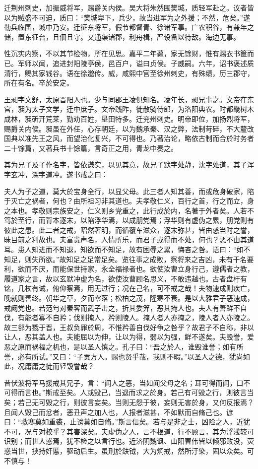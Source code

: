 \documentclass[12pt,UTF8]{ctexbook}
\begin{document}
迁荆州刺史，加振威将军，赐爵关内侯。吴大将朱然围樊城，质轻军赴之。议者皆以为贼盛不可迫，质曰：“樊城卑下，兵少，故当进军为之外援；不然，危矣。”遂勒兵临围，城中乃安。迁征东将军，假节都督青、徐诸军事。广农积谷，有兼年之储，置东征台，且佃且守。又通渠诸郡，利舟楫，严设备以待敌。海边无事。

性沉实内察，不以其节检物，所在见思。嘉平二年薨，家无馀财，惟有赐衣书箧而已。军师以闻，追进封阳陵亭侯，邑百户，谥曰贞侯。子威嗣。六年，诏书褒述质清行，赐其家钱谷。语在徐邈传。威，咸熙中官至徐州刺史，有殊绩，历三郡守，所在有名。卒於安定。

王昶字文舒，太原晋阳人也。少与同郡王凌俱知名。凌年长，昶兄事之。文帝在东宫，昶为太子文学，迁中庶子。文帝践阼，徙散骑侍郎，为洛阳典农。时都畿树木成林，昶斫开荒莱，勤劝百姓，垦田特多。迁兖州刺史。明帝即位，加扬烈将军，赐爵关内侯。昶虽在外任，心存朝廷，以为魏承秦、汉之弊，法制苛碎，不大釐改国典以准先王之风，而望治化复兴，不可得也。乃著治论，略依古制而合於时务者二十馀篇，又著兵书十馀篇，言奇正之用，青龙中奏之。

其为兄子及子作名字，皆依谦实，以见其意，故兄子默字处静，沈字处道，其子浑字玄冲，深字道冲。遂书戒之曰：

夫人为子之道，莫大於宝身全行，以显父母。此三者人知其善，而或危身破家，陷于灭亡之祸者，何也？由所祖习非其道也。夫孝敬仁义，百行之首，行之而立，身之本也。孝敬则宗族安之，仁义则乡党重之，此行成於内，名著于外者矣。人若不笃於至行，而背本逐末，以陷浮华焉，以成朋党焉；浮华则有虚伪之累，朋党则有彼此之患。此二者之戒，昭然著明，而循覆车滋众，逐末弥甚，皆由惑当时之誉，昧目前之利故也。夫富贵声名，人情所乐，而君子或得而不处，何也？恶不由其道耳。患人知进而不知退，知欲而不知足，故有困辱之累，悔吝之咎。语曰：“如不知足，则失所欲。”故知足之足常足矣。览往事之成败，察将来之吉凶，未有干名要利，欲而不厌，而能保世持家，永全福禄者也。欲使汝曹立身行己，遵儒者之教，履道家之言，故以玄默冲虚为名，欲使汝曹顾名思义，不敢违越也。古者盘杅有铭，几杖有诫，俯仰察焉，用无过行；况在己名，可不戒之哉！夫物速成则疾亡，晚就则善终。朝华之草，夕而零落；松柏之茂，隆寒不衰。是以大雅君子恶速成，戒阙党也。若范匄对秦客而武子击之，折其委笄，恶其掩人也。夫人有善鲜不自伐，有能者寡不自矜；伐则掩人，矜则陵人。掩人者人亦掩之，陵人者人亦陵之。故三郤为戮于晋，王叔负罪於周，不惟矜善自伐好争之咎乎？故君子不自称，非以让人，恶其盖人也。夫能屈以为伸，让以为得，弱以为强，鲜不遂矣。夫毁誉，爱恶之原而祸福之机也，是以圣人慎之。孔子曰：“吾之於人，谁毁谁誉；如有所誉，必有所试。”又曰：“子贡方人。赐也贤乎哉，我则不暇。”以圣人之德，犹尚如此，况庸庸之徒而轻毁誉哉？

昔伏波将军马援戒其兄子，言：“闻人之恶，当如闻父母之名；耳可得而闻，口不可得而言也。”斯戒至矣。人或毁己，当退而求之於身。若己有可毁之行，则彼言当矣；若己无可毁之行，则彼言妄矣。当则无怨于彼，妄则无害於身，又何反报焉？且闻人毁己而忿者，恶丑声之加人也，人报者滋甚，不如默而自脩己也。谚曰：“救寒莫如重裘，止谤莫如自脩。”斯言信矣。若与是非之士，凶险之人，近犹不可，况与对校乎？其害深矣。夫虚伪之人，言不根道，行不顾言，其为浮浅较可识别；而世人惑焉，犹不检之以言行也。近济阴魏讽、山阳曹伟皆以倾邪败没，荧惑当世，挟持奸慝，驱动后生。虽刑於鈇钺，大为炯戒，然所汙染，固以众矣。可不慎与！
\end{document}

